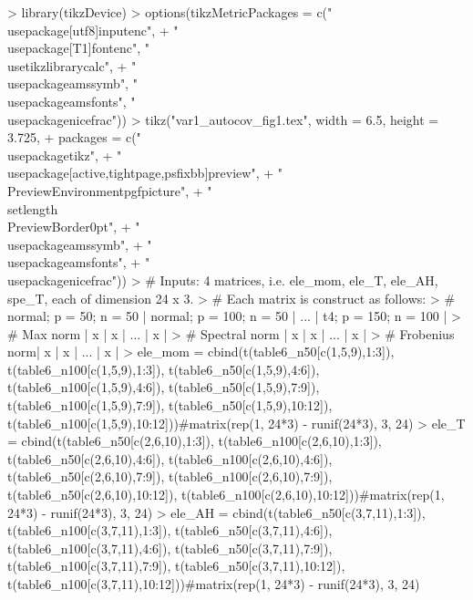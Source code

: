 \documentclass{article}
\begin{document}
\begin{Schunk}
\begin{Sinput}
> library(tikzDevice)
> options(tikzMetricPackages = c("\\usepackage[utf8]{inputenc}",
+     "\\usepackage[T1]{fontenc}", "\\usetikzlibrary{calc}",
+     "\\usepackage{amssymb}", "\\usepackage{amsfonts}", "\\usepackage{nicefrac}"))
> tikz("var1_autocov_fig1.tex", width = 6.5, height = 3.725,
+      packages = c("\\usepackage{tikz}",
+                  "\\usepackage[active,tightpage,psfixbb]{preview}",
+                  "\\PreviewEnvironment{pgfpicture}",
+                  "\\setlength\\PreviewBorder{0pt}",
+                  "\\usepackage{amssymb}",
+                  "\\usepackage{amsfonts}",
+                  "\\usepackage{nicefrac}"))
> # Inputs: 4 matrices, i.e. ele_mom, ele_T, ele_AH, spe_T, each of dimension 24 x 3.
> # Each matrix is construct as follows:
> #                normal; p = 50; n = 50 | normal; p = 100; n = 50 | ... | t4; p = 150; n = 100 |
> # Max norm      |            x          |         x               | ... |         x            |
> # Spectral norm |            x          |         x               | ... |         x            |
> # Frobenius norm|            x          |         x               | ... |         x            |
> ele_mom = cbind(t(table6_n50[c(1,5,9),1:3]), t(table6_n100[c(1,5,9),1:3]), t(table6_n50[c(1,5,9),4:6]), t(table6_n100[c(1,5,9),4:6]), t(table6_n50[c(1,5,9),7:9]), t(table6_n100[c(1,5,9),7:9]), t(table6_n50[c(1,5,9),10:12]), t(table6_n100[c(1,5,9),10:12]))#matrix(rep(1, 24*3) - runif(24*3), 3, 24)
> ele_T = cbind(t(table6_n50[c(2,6,10),1:3]), t(table6_n100[c(2,6,10),1:3]), t(table6_n50[c(2,6,10),4:6]), t(table6_n100[c(2,6,10),4:6]), t(table6_n50[c(2,6,10),7:9]), t(table6_n100[c(2,6,10),7:9]), t(table6_n50[c(2,6,10),10:12]), t(table6_n100[c(2,6,10),10:12]))#matrix(rep(1, 24*3) - runif(24*3), 3, 24)
> ele_AH = cbind(t(table6_n50[c(3,7,11),1:3]), t(table6_n100[c(3,7,11),1:3]), t(table6_n50[c(3,7,11),4:6]), t(table6_n100[c(3,7,11),4:6]), t(table6_n50[c(3,7,11),7:9]), t(table6_n100[c(3,7,11),7:9]), t(table6_n50[c(3,7,11),10:12]), t(table6_n100[c(3,7,11),10:12]))#matrix(rep(1, 24*3) - runif(24*3), 3, 24)

\end{Sinput}
\end{Schunk}
\end{document}
